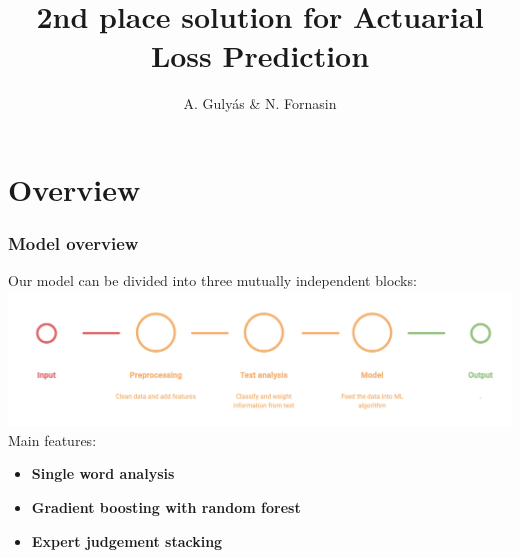 \documentclass{beamer}
\title{2nd place solution for Actuarial Loss Prediction} %
\author{A. Guly\'{a}s \& N. Fornasin} %
\institute[ALU] %
{
Team Boosted Goose\\ %
\medskip
}
\date{\quad} %
\begin{document}
\begin{frame}
\titlepage %
\end{frame}







\section{Overview}
\begin{frame}
\frametitle{Model overview}
Our model can be divided into three mutually independent blocks:
\includegraphics[width=\textwidth]{./images/modeldiagram.png}
Main features:
\begin{itemize}
\item \textbf{Single word analysis}
\item \textbf{Gradient boosting with random forest}
\item \textbf{Expert judgement stacking}
\end{itemize}
\end{frame}
\end{document}
